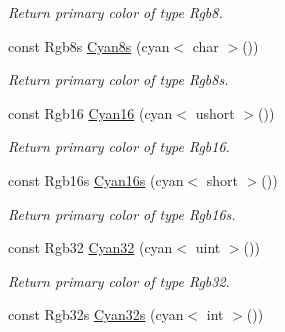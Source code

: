 \begin{DoxyCompactItemize}
\begin{DoxyCompactList}\small\item\em Return primary color of type Rgb8. \end{DoxyCompactList}\item 
\hypertarget{group___primary_colors_ga478abd1bda71241ece158980514d2284}{const Rgb8s \hyperlink{group___primary_colors_ga478abd1bda71241ece158980514d2284}{Cyan8s} (cyan$<$ char $>$())}\label{group___primary_colors_ga478abd1bda71241ece158980514d2284}

\begin{DoxyCompactList}\small\item\em Return primary color of type Rgb8s. \end{DoxyCompactList}\item 
\hypertarget{group___primary_colors_ga4559d64d2aefd0bc159d0a5cff0d3ea3}{const Rgb16 \hyperlink{group___primary_colors_ga4559d64d2aefd0bc159d0a5cff0d3ea3}{Cyan16} (cyan$<$ ushort $>$())}\label{group___primary_colors_ga4559d64d2aefd0bc159d0a5cff0d3ea3}

\begin{DoxyCompactList}\small\item\em Return primary color of type Rgb16. \end{DoxyCompactList}\item 
\hypertarget{group___primary_colors_gafb6d4a0e35de27b2f598c5fdf5ff7673}{const Rgb16s \hyperlink{group___primary_colors_gafb6d4a0e35de27b2f598c5fdf5ff7673}{Cyan16s} (cyan$<$ short $>$())}\label{group___primary_colors_gafb6d4a0e35de27b2f598c5fdf5ff7673}

\begin{DoxyCompactList}\small\item\em Return primary color of type Rgb16s. \end{DoxyCompactList}\item 
\hypertarget{group___primary_colors_ga35bcab728235dd30ac3f54e351e5b36d}{const Rgb32 \hyperlink{group___primary_colors_ga35bcab728235dd30ac3f54e351e5b36d}{Cyan32} (cyan$<$ uint $>$())}\label{group___primary_colors_ga35bcab728235dd30ac3f54e351e5b36d}

\begin{DoxyCompactList}\small\item\em Return primary color of type Rgb32. \end{DoxyCompactList}\item 
\hypertarget{group___primary_colors_ga453129ba2b1378cb5568721d637b5b71}{const Rgb32s \hyperlink{group___primary_colors_ga453129ba2b1378cb5568721d637b5b71}{Cyan32s} (cyan$<$ int $>$())}\label{group___primary_colors_ga453129ba2b1378cb5568721d637b5b71}


\end{DoxyCompactItemize}

